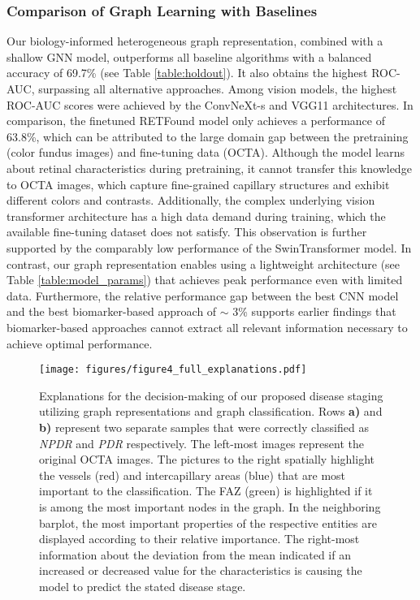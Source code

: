 \subsubsection{Comparison of Graph Learning with Baselines}
Our biology-informed heterogeneous graph representation, combined with a shallow GNN model, outperforms all baseline algorithms with a balanced accuracy of 69.7\% (see Table \ref{table:holdout}). 
It also obtains the highest ROC-AUC, surpassing all alternative approaches. Among vision models, the highest ROC-AUC scores were achieved by the ConvNeXt-s and VGG11 architectures. In comparison, the finetuned RETFound model only achieves a performance of 63.8\%, which can be attributed to the large domain gap between the pretraining (color fundus images) and fine-tuning data (OCTA). Although the model learns about retinal characteristics during pretraining, it cannot transfer this knowledge to OCTA images, which capture fine-grained capillary structures and exhibit different colors and contrasts. Additionally, the complex underlying vision transformer architecture has a high data demand during training, which the available fine-tuning dataset does not satisfy. This observation is further supported by the comparably low performance of the SwinTransformer model. In contrast, our graph representation enables using a lightweight architecture (see Table \ref{table:model_params}) that achieves peak performance even with limited data. Furthermore, the relative performance gap between the best CNN model and the best biomarker-based approach of $\sim$ 3\% supports earlier findings that biomarker-based approaches cannot extract all relevant information necessary to achieve optimal performance. 



\begin{figure*}[!ht]
   \centering
    \texttt{[image: figures/figure4\_full\_explanations.pdf]}
    \caption{Explanations for the decision-making of our proposed disease staging utilizing graph representations and graph classification. Rows \textbf{a)} and \textbf{b)} represent two separate samples that were correctly classified as \textit{NPDR} and \textit{PDR} respectively. The left-most images represent the original OCTA images. The pictures to the right spatially highlight the \textcolor{ves_spatial}{vessels} (red) and \textcolor{ica_spatial}{intercapillary areas} (blue) that are most important to the classification. The \textcolor{faz_spatial}{FAZ} (green) is highlighted if it is among the most important nodes in the graph. In the neighboring barplot, the most important properties of the respective entities are displayed according to their relative importance. The right-most information about the deviation from the mean indicated if an increased or decreased value for the characteristics is causing the model to predict the stated disease stage.}
    \vspace{-0.3cm}
    \label{fig:full_explanations}
\end{figure*}

